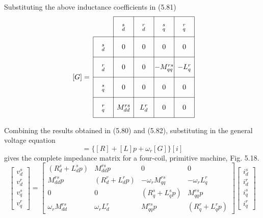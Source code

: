 \documentclass[a4paper,numbers=noenddot,12pt]{scrbook}
\begin{document}
Substituting the above inductance coefficients in (5.81)
\begin{equation}
    \begin{tikzpicture} [anchor = base, baseline =0pt]
        \draw (0,0)--(5,0) (0,1)--(5,1) (0,2)--(5,2) (1,3)--(5,3) (0,-1)--(5,-1) (0,-2)--(5,-2);
        \draw (0,-2)--(0,2) (1,-2)--(1,3) (2,-2)--(2,3) (3,-2)--(3,3) (4,-2)--(4,3) (5,-2)--(5,3);
        \draw (0.5,-1.6) node{$_q^r$} +(0,1) node{$_q^s$} +(0,2) node{$_d^r$} +(0,3) node{$_d^s$};
        \draw (1.5,-1.6) node{$M_{dd}^{rs}$} +(0,1) node{0} +(0,2) node{0} +(0,3) node{0}+(0,4) node{$_d^s$};
        \draw (2.5,-1.6) node{$L_{d}^{r}$} +(0,1) node{0} +(0,2) node{0} +(0,3) node{0}+(0,4) node{$_d^r$};
        \draw (3.5,-1.6) node{0} +(0,1) node{0} +(0,2) node{$-M_{qq}^{rs}$} +(0,3) node{0}+(0,4) node{$_q^s$};
        \draw (4.5,-1.6) node{0} +(0,1) node{0} +(0,2) node{$-L_{q}^{r}$} +(0,3) node{0}+(0,4) node{$_q^r$};
        \draw (-0.6,-0.1) node{$[G] =$};
    \end{tikzpicture}
\end{equation}

Combining the results obtained in (5.80) and (5.82), substituting in the general voltage equation
\begin{equation*}
    [v] = \{[R] + [L]p+\omega_r[G]\}[i]
\end{equation*}
gives the complete impedance matrix for a four-coil, primitive machine, Fig. 5.18.
\begin{equation}
    \begin{bmatrix}
        v_d^s \\ v_d^r \\ v_q^s \\ v_q^r
    \end{bmatrix}
    =
    \begin{bmatrix}
        (R_d^s + L_d^s p) & M_{dd}^{rs}p & 0 & 0\\
        M_{dd}^{rs}p & (R_d^r + L_d^r p) & -\omega_r M_{qq}^{rs} &-\omega_r L_q^r \\
        0 & 0 & (R_q^s + L_q^s p) & M_{qq}^{rs} p \\
        \omega_r M_{dd}^{rs} & \omega_r L_{d}^{r} & M_{qq}^{rs} p & (R_q^r + L_q^r p)
    \end{bmatrix}
    \begin{bmatrix}
        i_d^s \\ i_d^r \\ i_q^s \\ i_q^r
    \end{bmatrix}
\end{equation}
\end{document}
